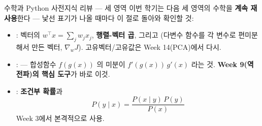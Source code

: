 \begin{frame}{수학과 Python 사전지식 리뷰 --- 세 영역}
  이번 학기는 다음 세 영역의 수학을 \textbf{계속 재사용}한다 ---
  낯선 표기가 나올 때마다 이 절로 돌아와 확인할 것:
  \begin{itemize}
    \item {}: 벡터의 
      $w^\top x = \sum_j w_j x_j$, \textbf{행렬-벡터 곱}, 그리고
      (다변수 함수를 각 변수로 편미분해서 만든
      벡터, $\nabla_w J$). 고유벡터/고유값은 Week 14(PCA)에서
      다시.
    \item {}:  --- 합성함수
      $f(g(x))$ 의 미분이 $f'(g(x))\,g'(x)$ 라는 것.
      \textbf{Week 9(역전파)의 핵심 도구}가 바로 이것.
    \item {}: \textbf{조건부 확률}과 
      \[P(y \mid x) = \frac{P(x \mid y)\,P(y)}{P(x)}\]
      Week 3에서 본격적으로 사용.
  \end{itemize}
\end{frame}
